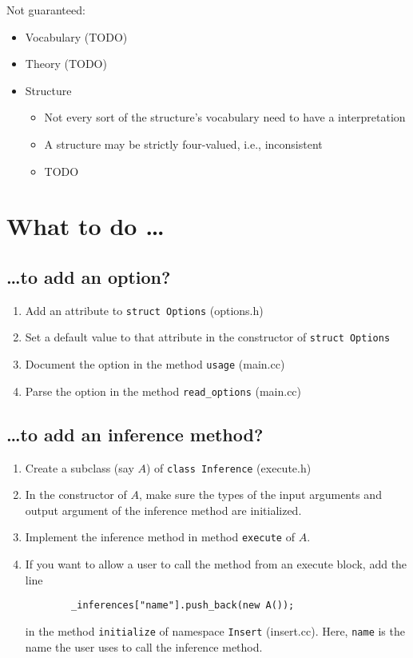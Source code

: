 \documentclass{article}
\begin{document}
Not guaranteed:
\begin{itemize}
	\item Vocabulary (TODO)
	\item Theory (TODO)
	\item Structure
	\begin{itemize}
		\item Not every sort of the structure's vocabulary need to have a interpretation
		\item A structure may be strictly four-valued, i.e., inconsistent
		\item TODO
	\end{itemize}
\end{itemize}

\section{What to do \ldots}\label{sec:whattodo}

\subsection*{\ldots to add an option?}
\begin{enumerate}
	\item Add an attribute to \texttt{struct Options} (options.h)
	\item Set a default value to that attribute in the constructor of \texttt{struct Options}
	\item Document the option in the method \texttt{usage} (main.cc)
	\item Parse the option in the method \texttt{read\_options} (main.cc)
\end{enumerate}

\subsection*{\ldots to add an inference method?}
\begin{enumerate}
	\item Create a subclass (say $A$) of \texttt{class Inference} (execute.h)
	\item In the constructor of $A$, make sure the types of the input arguments and output argument of the inference method are initialized.
	\item Implement the inference method in method \texttt{execute} of $A$.
	\item If you want to allow a user to call the method from an execute block, add the line 
	\begin{lstlisting}
		_inferences["name"].push_back(new A());
	\end{lstlisting}
	in the method \texttt{initialize} of namespace \texttt{Insert} (insert.cc). Here, \texttt{name} is the name the user uses to call the inference method.
\end{enumerate}
\end{document}
